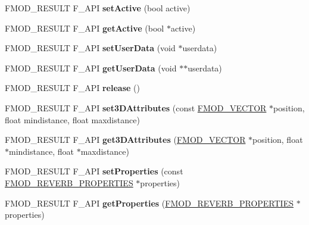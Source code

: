\begin{DoxyCompactItemize}
F\+M\+O\+D\+\_\+\+R\+E\+S\+U\+LT F\+\_\+\+A\+PI {\bfseries set\+Active} (bool active)
\item 
\mbox{\label{classFMOD_1_1Reverb3D_afc78687f3aec76b996218fa22e0c25cb}} 
F\+M\+O\+D\+\_\+\+R\+E\+S\+U\+LT F\+\_\+\+A\+PI {\bfseries get\+Active} (bool $\ast$active)
\item 
\mbox{\label{classFMOD_1_1Reverb3D_a7e4d0fb62d33f2cbca23e38998f8e53c}} 
F\+M\+O\+D\+\_\+\+R\+E\+S\+U\+LT F\+\_\+\+A\+PI {\bfseries set\+User\+Data} (void $\ast$userdata)
\item 
\mbox{\label{classFMOD_1_1Reverb3D_a6acd23caa1ebbee25749bd390280d045}} 
F\+M\+O\+D\+\_\+\+R\+E\+S\+U\+LT F\+\_\+\+A\+PI {\bfseries get\+User\+Data} (void $\ast$$\ast$userdata)
\item 
\mbox{\label{classFMOD_1_1Reverb3D_a727b122d300135459a2f1cd59d0d7941}} 
F\+M\+O\+D\+\_\+\+R\+E\+S\+U\+LT F\+\_\+\+A\+PI {\bfseries release} ()
\item 
\mbox{\label{classFMOD_1_1Reverb3D_aaeb05688174876fec05c1f3bc0576be8}} 
F\+M\+O\+D\+\_\+\+R\+E\+S\+U\+LT F\+\_\+\+A\+PI {\bfseries set3\+D\+Attributes} (const \hyperlink{structFMOD__VECTOR}{F\+M\+O\+D\+\_\+\+V\+E\+C\+T\+OR} $\ast$position, float mindistance, float maxdistance)
\item 
\mbox{\label{classFMOD_1_1Reverb3D_a0778c0c504ff5c3d4e5e2b8e66e9c31d}} 
F\+M\+O\+D\+\_\+\+R\+E\+S\+U\+LT F\+\_\+\+A\+PI {\bfseries get3\+D\+Attributes} (\hyperlink{structFMOD__VECTOR}{F\+M\+O\+D\+\_\+\+V\+E\+C\+T\+OR} $\ast$position, float $\ast$mindistance, float $\ast$maxdistance)
\item 
\mbox{\label{classFMOD_1_1Reverb3D_a567c38962a1063fdfa74353b7991ed89}} 
F\+M\+O\+D\+\_\+\+R\+E\+S\+U\+LT F\+\_\+\+A\+PI {\bfseries set\+Properties} (const \hyperlink{structFMOD__REVERB__PROPERTIES}{F\+M\+O\+D\+\_\+\+R\+E\+V\+E\+R\+B\+\_\+\+P\+R\+O\+P\+E\+R\+T\+I\+ES} $\ast$properties)
\item 
\mbox{\label{classFMOD_1_1Reverb3D_a63821bb5d2f34e3f246cb91e49188871}} 
F\+M\+O\+D\+\_\+\+R\+E\+S\+U\+LT F\+\_\+\+A\+PI {\bfseries get\+Properties} (\hyperlink{structFMOD__REVERB__PROPERTIES}{F\+M\+O\+D\+\_\+\+R\+E\+V\+E\+R\+B\+\_\+\+P\+R\+O\+P\+E\+R\+T\+I\+ES} $\ast$properties)
$$
\end{DoxyCompactItemize}
